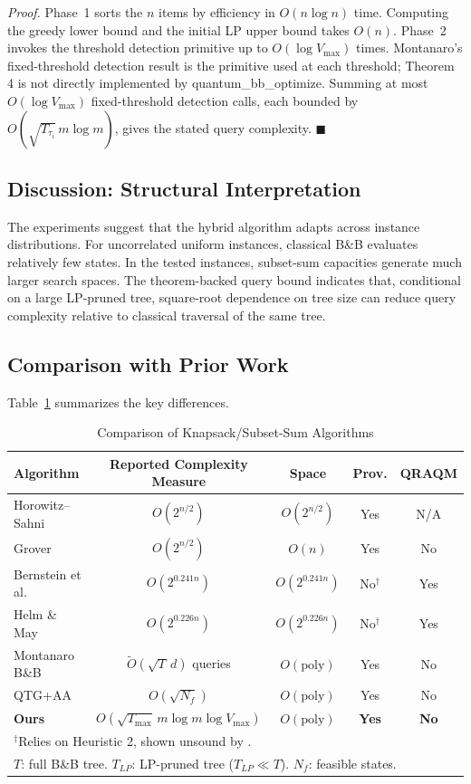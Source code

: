 \documentclass[conference]{IEEEtran}
\begin{document}
\textit{Proof.} Phase~1 sorts the $n$ items by efficiency in $O(n \log n)$ time. Computing the greedy lower bound and the initial LP upper bound takes $O(n)$. Phase~2 invokes the threshold detection primitive up to $O(\log V_{\max})$ times. Montanaro's fixed-threshold detection result is the primitive used at each threshold; Theorem 4 is not directly implemented by quantum\_bb\_optimize. Summing at most $O(\log V_{\max})$ fixed-threshold detection calls, each bounded by $O(\sqrt{T_{\tau_i}}\,m\log m)$, gives the stated query complexity. \hfill$\blacksquare$

\subsection{Discussion: Structural Interpretation}
The experiments suggest that the hybrid algorithm adapts across instance distributions. For uncorrelated uniform instances, classical B\&B evaluates relatively few states. In the tested instances, subset-sum capacities generate much larger search spaces. The theorem-backed query bound indicates that, conditional on a large LP-pruned tree, square-root dependence on tree size can reduce query complexity relative to classical traversal of the same tree.

\subsection{Comparison with Prior Work}

Table~\ref{tab:comparison} summarizes the key differences.

\begin{table}[t]
\caption{Comparison of Knapsack/Subset-Sum Algorithms}
\label{tab:comparison}
\begin{center}
\footnotesize
\begin{tabular}{lcccc}
\toprule
\textbf{Algorithm} & \textbf{Reported Complexity Measure} & \textbf{Space} & \textbf{Prov.} & \textbf{QRAQM} \\
\midrule
Horowitz--Sahni & $O(2^{n/2})$ & $O(2^{n/2})$ & Yes & N/A \\
Grover & $O(2^{n/2})$ & $O(n)$ & Yes & No \\
Bernstein et al. & $O(2^{0.241n})$ & $O(2^{0.241n})$ & No$^\dagger$ & Yes \\
Helm \& May & $O(2^{0.226n})$ & $O(2^{0.226n})$ & No$^\dagger$ & Yes \\
Montanaro B\&B & $\tilde{O}(\sqrt{T}\,d)$ queries & $O(\text{poly})$ & Yes & No \\
QTG+AA & $O(\sqrt{N_f})$ & $O(\text{poly})$ & Yes & No \\
\textbf{Ours} & $O(\sqrt{T_{\max}}\,m\log m\log V_{\max})$ & $O(\text{poly})$ & \textbf{Yes} & \textbf{No} \\
\bottomrule
\multicolumn{5}{p{0.7\textwidth}}{\footnotesize $^\dagger$Relies on Heuristic 2, shown unsound by \cite{bonnetain2020improved}.} \\
\multicolumn{5}{p{0.7\textwidth}}{\footnotesize $T$: full B\&B tree. $T_{LP}$: LP-pruned tree ($T_{LP} \ll T$). $N_f$: feasible states.}
\end{tabular}
\end{center}
\end{table}
\end{document}
